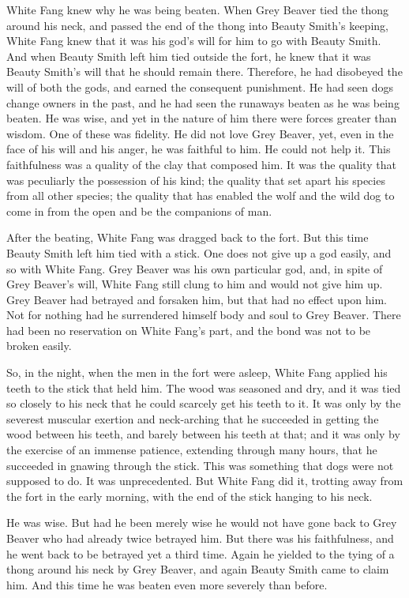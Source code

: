 \documentclass[10pt]{book}
\begin{document}
White Fang knew why he was being beaten. When Grey Beaver tied the
thong around his neck, and passed the end of the thong into Beauty
Smith’s keeping, White Fang knew that it was his god’s will for him to
go with Beauty Smith. And when Beauty Smith left him tied outside the
fort, he knew that it was Beauty Smith’s will that he should remain
there. Therefore, he had disobeyed the will of both the gods, and
earned the consequent punishment. He had seen dogs change owners in the
past, and he had seen the runaways beaten as he was being beaten. He
was wise, and yet in the nature of him there were forces greater than
wisdom. One of these was fidelity. He did not love Grey Beaver, yet,
even in the face of his will and his anger, he was faithful to him. He
could not help it. This faithfulness was a quality of the clay that
composed him. It was the quality that was peculiarly the possession of
his kind; the quality that set apart his species from all other
species; the quality that has enabled the wolf and the wild dog to come
in from the open and be the companions of man.

After the beating, White Fang was dragged back to the fort. But this
time Beauty Smith left him tied with a stick. One does not give up a
god easily, and so with White Fang. Grey Beaver was his own particular
god, and, in spite of Grey Beaver’s will, White Fang still clung to him
and would not give him up. Grey Beaver had betrayed and forsaken him,
but that had no effect upon him. Not for nothing had he surrendered
himself body and soul to Grey Beaver. There had been no reservation on
White Fang’s part, and the bond was not to be broken easily.

So, in the night, when the men in the fort were asleep, White Fang
applied his teeth to the stick that held him. The wood was seasoned and
dry, and it was tied so closely to his neck that he could scarcely get
his teeth to it. It was only by the severest muscular exertion and
neck-arching that he succeeded in getting the wood between his teeth,
and barely between his teeth at that; and it was only by the exercise
of an immense patience, extending through many hours, that he succeeded
in gnawing through the stick. This was something that dogs were not
supposed to do. It was unprecedented. But White Fang did it, trotting
away from the fort in the early morning, with the end of the stick
hanging to his neck.

He was wise. But had he been merely wise he would not have gone back to
Grey Beaver who had already twice betrayed him. But there was his
faithfulness, and he went back to be betrayed yet a third time. Again
he yielded to the tying of a thong around his neck by Grey Beaver, and
again Beauty Smith came to claim him. And this time he was beaten even
more severely than before.
\end{document}
